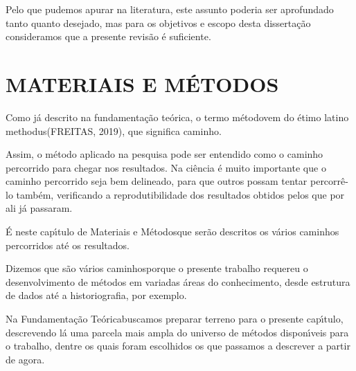 \documentclass[
12pt,		%
openright,	%
twoside,  %
a4paper,			%
chapter=TITLE,		%
english,			%
french,				%
spanish,			%
brazil				%
]{USPSC-classe/USPSC_RedarTex}
\begin{document}
Pelo que pudemos apurar na literatura, este assunto poderia ser aprofundado tanto quanto desejado, mas para os objetivos e escopo desta disserta\c{c}\~ao consideramos que a presente revis\~ao \'e suficiente.








\chapter[MATERIAIS E M\'ETODOS]{MATERIAIS E M\'ETODOS}\label{MATERIAIS E M\'ETODOS}
Como j\'a descrito na fundamenta\c{c}\~ao te\'orica, o termo \textquotedbl m\'etodo\textquotedbl  vem do \'etimo latino \textquotedbl methodus\textquotedbl   (FREITAS, 2019), que significa \textquotedbl caminho\textquotedbl .








Assim, o m\'etodo aplicado na pesquisa pode ser entendido como o caminho percorrido para chegar nos resultados. Na ci\^encia \'e muito importante que o caminho percorrido seja bem delineado, para que outros possam tentar percorr\^e-lo tamb\'em, verificando a reprodutibilidade dos resultados obtidos pelos que por ali j\'a passaram.








\'E neste cap\'{\i}tulo de \textquotedbl Materiais e M\'etodos\textquotedbl  que ser\~ao descritos os v\'arios caminhos percorridos at\'e os resultados.








Dizemos que s\~ao \textquotedbl v\'arios caminhos\textquotedbl  porque o presente trabalho requereu o desenvolvimento de m\'etodos em variadas \'areas do conhecimento, desde estrutura de dados at\'e a historiografia, por exemplo.








Na \textquotedbl Fundamenta\c{c}\~ao Te\'orica\textquotedbl  buscamos preparar terreno para o presente cap\'{\i}tulo, descrevendo l\'a uma parcela mais ampla do universo de m\'etodos dispon\'{\i}veis para o trabalho, dentre os quais foram escolhidos os que passamos a descrever a partir de agora.
\end{document}
